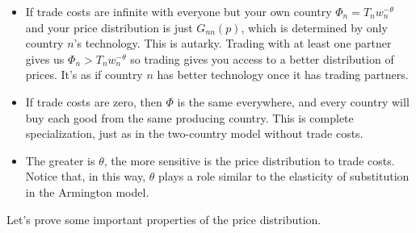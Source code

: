 \documentclass[11pt, pdftex]{article}
\begin{document}
\begin{itemize}
\item If trade costs are infinite with everyone but your own country $\Phi_n=T_nw_n^{-\theta}$ and your price distribution is just $G_{nn}(p)$, which is determined by only country $n$'s technology.  This is autarky. Trading with at least one partner gives us $\Phi_n>T_nw_n^{-\theta}$ so trading gives you access to a better distribution of prices. It's as if country $n$ has better technology once it has trading partners.

\item If trade costs are zero, then $\Phi$ is the same everywhere, and every country will buy each good from the same producing country. This is complete specialization, just as in the two-country model without trade costs.

\item The greater is $\theta$, the more sensitive is the price distribution to trade costs.  Notice that, in this way, $\theta$ plays a role similar to the elasticity of substitution in the Armington model.
\end{itemize}

Let's prove some important properties of the price distribution.
\end{document}
